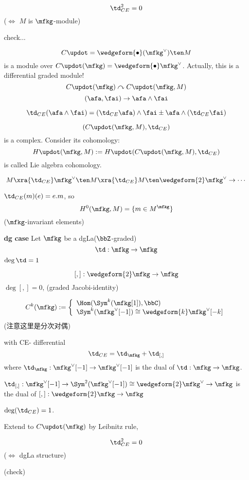 \begin{prop}
$$\td_{CE}^2=0$$
($\iff$ $M$ is $\mfkg$-module)
\end{prop}
check...

\begin{rem}
$$C\updot=\wedgeform{\bullet}(\mfkg^\vee)\ten M$$
is a module over $C\updot(\mfkg)=\wedgeform{\bullet}\mfkg^\vee$.
Actually, this is a differential graded module!
$$C\updot(\mfkg)\curvearrowright C\updot(\mfkg,M)$$
$$(\afa,\fai)\to \afa\wedge\fai$$

$$\td_{CE}(\afa\wedge\fai)=(\td_{CE}\afa)\wedge\fai\pm\afa\wedge(\td_{CE}\fai)$$
\end{rem}

\begin{rem}
$$(C\updot(\mfkg,M),\td_{CE})$$
is a complex. Consider its cohomology:
$$H\updot(\mfkg,M):=H\updot(C\updot(\mfkg,M),\td_{CE})$$
is called Lie algebra cohomology.
\end{rem}

$$M\xra{\td_{CE}}\mfkg^\vee\ten M\xra{\td_{CE}}
M\ten\wedgeform{2}\mfkg^\vee\to\cdots$$

$\td_{CE}(m)(e)=e.m$, so 
$$H^0(\mfkg,M)=\{m\in M^\mfkg\}$$
($\mfkg$-invariant elements)

\textbf{dg case}
Let $\mfkg$ be a dgLa($\bbZ$-graded)
$$\td:\mfkg\to\mfkg$$
$\deg\td=1$

$$[,]:\wedgeform{2}\mfkg\to\mfkg$$
$\deg[,]=0$,
(graded Jacobi-identity)

\begin{definition}
$$
  C^k(\mfkg):=
    \left\{
      \begin{array}{l}
        \Hom(\Sym^k(\mfkg[1]),\bbC)  \\
        \Sym^k(\mfkg^\vee[-1])\cong\wedgeform{k}\mfkg^\vee[-k]
      \end{array}
    \right.
$$
(注意这里是分次对偶)

with CE- differential
$$\td_{CE}=\td_{\mfkg}+\td_{[,]}$$
where $\td_{\mfkg}:\mfkg^\vee[-1]\to\mfkg^\vee[-1]$ is the dual of $\td:\mfkg\to\mfkg$.

$\td_{[,]}:\mfkg^\vee[-1]\to \Sym^2(\mfkg^\vee[-1])\cong\wedgeform{2}\mfkg^\vee\to\mfkg$
is the dual of $[,]:\wedgeform{2}\mfkg\to\mfkg$
\end{definition}

$\deg(\td_{CE})=1$.

Extend to $C\updot(\mfkg)$ by Leibnitz rule,
\begin{prop}
$$\td_{CE}^2=0$$
($\iff$ dgLa structure)
\end{prop}
(check)

